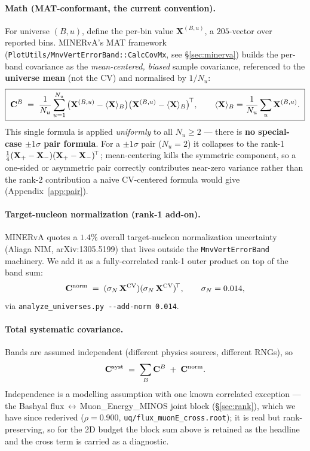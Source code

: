 \paragraph{Math (MAT-conformant, the current convention).}
For universe $(B,u)$, define the per-bin value
$\mathbf{X}^{(B,u)}$, a $205$-vector over reported bins. MINERvA's MAT
framework
(\texttt{PlotUtils/MnvVertErrorBand::CalcCovMx}, see \S\ref{sec:minerva})
builds the per-band covariance as the \emph{mean-centered, biased}
sample covariance, referenced to the \textbf{universe mean} (not the
CV) and normalised by $1/N_{u}$:
\begin{equation}
\boxed{\;
\mathbf{C}^{B}
\;=\;
\frac{1}{N_{u}}\sum_{u=1}^{N_{u}}
\big(\mathbf{X}^{(B,u)} - \langle\mathbf{X}\rangle_{B}\big)
\big(\mathbf{X}^{(B,u)} - \langle\mathbf{X}\rangle_{B}\big)^{\!\top},
\qquad
\langle\mathbf{X}\rangle_{B} = \frac{1}{N_{u}}\sum_{u}\mathbf{X}^{(B,u)}.
\;}
\label{eq:matcov}
\end{equation}
This single formula is applied \emph{uniformly} to all $N_{u}\ge 2$ ---
there is \textbf{no special-case $\pm1\sigma$ pair formula}. For a
$\pm1\sigma$ pair ($N_{u}=2$) it collapses to the rank-1
$\tfrac14(\mathbf{X}_{+}-\mathbf{X}_{-})(\mathbf{X}_{+}-\mathbf{X}_{-})^{\!\top}$;
mean-centering kills the symmetric component, so a one-sided or
asymmetric pair correctly contributes near-zero variance rather than
the rank-2 contribution a naive CV-centered formula would give
(Appendix~\ref{app:pair}).

\paragraph{Target-nucleon normalization (rank-1 add-on).}
MINERvA quotes a $1.4\%$ overall target-nucleon normalization
uncertainty (Aliaga NIM, arXiv:1305.5199) that lives outside the
\texttt{MnvVertErrorBand} machinery. We add it as a fully-correlated
rank-1 outer product on top of the band sum:
\begin{equation}
\mathbf{C}^{\text{norm}} \;=\; (\sigma_{N}\,\mathbf{X}^{\text{CV}})(\sigma_{N}\,\mathbf{X}^{\text{CV}})^{\!\top},
\qquad \sigma_{N} = 0.014,
\label{eq:normband}
\end{equation}
via \texttt{analyze\_universes.py -{}-add-norm 0.014}.

\paragraph{Total systematic covariance.}
Bands are assumed independent (different physics sources, different
RNGs), so
\begin{equation}
\mathbf{C}^{\text{syst}}
\;=\;
\sum_{B}\mathbf{C}^{B}\;+\;\mathbf{C}^{\text{norm}}.
\label{eq:systblocksum}
\end{equation}
Independence is a modelling assumption with one known correlated exception --- the
Bashyal flux\,$\leftrightarrow$\,Muon\_Energy\_MINOS joint block
(\S\ref{sec:rank}), which we have since rederived ($\rho=0.900$,
\texttt{uq/flux\_muonE\_cross.root}); it is real but rank-preserving, so for the
2D budget the block sum above is retained as the headline and the cross term is
carried as a diagnostic.

